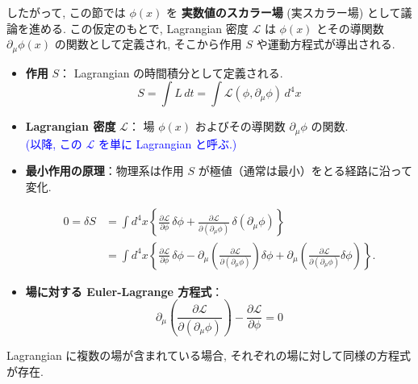 \documentclass[a4paper,12pt]{article}
\begin{document}
したがって, この節では $\phi(x)$ を \textbf{実数値のスカラー場} (実スカラー場) として議論を進める. この仮定のもとで, Lagrangian 密度 $\mathcal{L}$ は $\phi(x)$ とその導関数 $\partial_\mu \phi(x)$ の関数として定義され, そこから作用 $S$ や運動方程式が導出される.

\color{black}

\begin{itemize}
    \item \textbf{作用} $S$： Lagrangian の時間積分として定義される.
    \begin{equation*}
        S = \int L\,dt = \int \mathcal{L}(\phi, \partial_\mu \phi)\,d^4x \tag{2.1}
    \end{equation*}

    \item \textbf{Lagrangian 密度} $\mathcal{L}$： 場 $\phi(x)$ およびその導関数 $\partial_\mu \phi$ の関数.\\
    \hspace{4cm} \textcolor{blue}{ (以降, この $\mathcal{L}$ を単に Lagrangian と呼ぶ.) }

    \item \textbf{最小作用の原理}：物理系は作用 $S$ が極値（通常は最小）をとる経路に沿って変化.
    
    \begin{align*}
        0 = \delta S 
        &= \int d^4x \left\{ \frac{\partial \mathcal{L}}{\partial \phi} \, \delta \phi 
        + \frac{\partial \mathcal{L}}{\partial (\partial_\mu \phi)} \, \delta(\partial_\mu \phi) \right\} \\
        &= \int d^4x \left\{ \frac{\partial \mathcal{L}}{\partial \phi} \, \delta \phi 
        - \partial_\mu \left( \frac{\partial \mathcal{L}}{\partial (\partial_\mu \phi)} \right) \delta \phi 
        + \partial_\mu \left( \frac{\partial \mathcal{L}}{\partial (\partial_\mu \phi)} \delta \phi \right) \right\}. \tag{2.2}
    \end{align*}
        

    \item \textbf{場に対する Euler-Lagrange 方程式}：
    \begin{equation}
        \partial_\mu \left( \frac{\partial \mathcal{L}}{\partial (\partial_\mu \phi)} \right) - \frac{\partial \mathcal{L}}{\partial \phi} = 0 \tag{2.3}
    \end{equation}
\end{itemize}

\noindent Lagrangian に複数の場が含まれている場合, それぞれの場に対して同様の方程式が存在.
\end{document}
